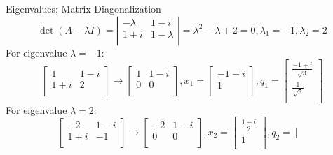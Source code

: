\documentclass{beamer}
\begin{document}
\begin{frame}{Eigenvalues; Matrix Diagonalization}
    \begin{equation*}
        \det \left( A-\lambda I \right) =\left| \begin{matrix}
        -\lambda&		1-i\\
        1+i&		1-\lambda\\
    \end{matrix} \right|=\lambda ^2-\lambda +2=0, \lambda _1=-1, \lambda _2=2
    \end{equation*}
    For eigenvalue $\lambda=-1$:
    \begin{equation*}
        \left[ \begin{matrix}
        1&		1-i\\
        1+i&		2\\
    \end{matrix} \right] \rightarrow \left[ \begin{matrix}
        1&		1-i\\
        0&		0\\
    \end{matrix} \right] , x_1=\left[ \begin{array}{c}
        -1+i\\
        1\\
    \end{array} \right] , q_1=\left[ \begin{array}{c}
        \frac{-1+i}{\sqrt{3}}\\
        \frac{1}{\sqrt{3}}\\
    \end{array} \right]
    \end{equation*}
    For eigenvalue $\lambda=2$:
    \begin{equation*}
        \left[ \begin{matrix}
        -2&		1-i\\
        1+i&		-1\\
    \end{matrix} \right] \rightarrow \left[ \begin{matrix}
        -2&		1-i\\
        0&		0\\
    \end{matrix} \right] , x_2=\left[ \begin{array}{c}
        \frac{1-i}{2}\\
        1\\
    \end{array} \right] , q_2=\left[ \begin{array}{c}

\end{array}
\end{equation*}
\end{frame}
\end{document}
